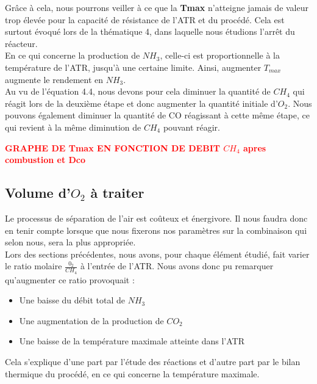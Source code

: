\documentclass[12pt]{report}
\begin{document}
Grâce à cela, nous pourrons veiller à ce que la \textbf{Tmax} n'atteigne jamais de valeur trop élevée pour la capacité de résistance de l'ATR et du procédé. Cela est surtout évoqué lors de la thématique 4, dans laquelle nous étudions l'arrêt du réacteur. \\

En ce qui concerne la production de $NH_3$, celle-ci est proportionnelle à la température de l'ATR, jusqu'à une certaine limite. Ainsi, augmenter $T_{max}$ augmente le rendement en $NH_3$.\\
Au vu de l'équation 4.4, nous devons pour cela diminuer la quantité de $CH_4$ qui réagit lors de la deuxième étape et donc augmenter la quantité initiale d'$O_2$. Nous pouvons également diminuer la quantité de CO réagissant à cette même étape, ce qui revient à la même diminution de $CH_4$ pouvant réagir.\\

 \bigskip

\begin{Huge}
\textcolor{red}{\textbf{GRAPHE DE Tmax EN FONCTION DE DEBIT $CH_4$ apres combustion et Dco}}
\end{Huge}

{\textcolor{carmine}{\chapter{Volume d'$O_2$ à traiter}}}

Le processus de séparation de l'air est coûteux et énergivore. Il nous faudra donc en tenir compte lorsque que nous fixerons nos paramètres sur la combinaison qui selon nous, sera la plus appropriée.\\

Lors des sections précédentes, nous avons, pour chaque élément étudié, fait varier le ratio molaire $\frac{0_2}{CH_4}$ à l'entrée de l'ATR.  Nous avons donc pu remarquer qu'augmenter ce ratio provoquait : \\
\begin{itemize}
\item Une baisse du débit total de $NH_3$
\item Une augmentation de la production de $CO_2$
\item Une baisse de la température maximale atteinte dans l'ATR
\end{itemize}

Cela s'explique d'une part par l'étude des réactions et d'autre part par le bilan thermique du procédé, en ce qui concerne la température maximale.\\
\end{document}
